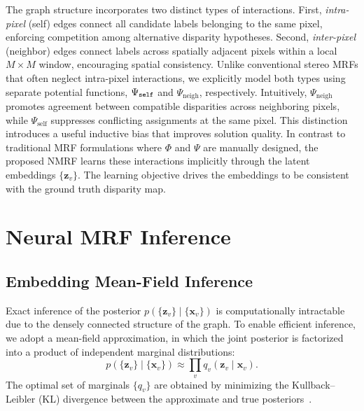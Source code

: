 The graph structure incorporates two distinct types of interactions.
First, \emph{intra-pixel} (self) edges connect all candidate labels belonging to the same pixel, enforcing competition among alternative disparity hypotheses.
Second, \emph{inter-pixel} (neighbor) edges connect labels across spatially adjacent pixels within a local $M \times M$ window, encouraging spatial consistency.
Unlike conventional stereo MRFs that often neglect intra-pixel interactions, we explicitly model both types using separate potential functions, $\Psi_{\tt{self}}$ and $\Psi_{\mathrm{neigh}}$, respectively.
Intuitively, $\Psi_{\mathrm{neigh}}$ promotes agreement between compatible disparities across neighboring pixels, while $\Psi_{\mathrm{self}}$ suppresses conflicting assignments at the same pixel. This distinction introduces a useful inductive bias that improves solution quality.
In contrast to traditional MRF formulations where $\Phi$ and $\Psi$ are manually designed, the proposed NMRF learns these interactions implicitly through the latent embeddings $\{\mathbf{z}_v\}$. The learning objective drives the embeddings to be consistent with the ground truth disparity map.

\section{Neural MRF Inference}\label{sec:mrf-inference}
\subsection{Embedding Mean-Field Inference}
Exact inference of the posterior $p(\{\mathbf{z}_v\} \mid \{\mathbf{x}_v\})$ is computationally intractable due to the densely connected structure of the graph.
To enable efficient inference, we adopt a mean-field approximation, in which the joint posterior is factorized into a product of independent marginal distributions:
\begin{equation}
	p(\{\mathbf{z}_v\} \mid \{\mathbf{x}_v\}) \approx \prod_{v} q_v(\mathbf{z}_v \mid \mathbf{x}_v).
\end{equation}
The optimal set of marginals $\{q_v\}$ are obtained by minimizing the Kullback–Leibler (KL) divergence between the approximate and true posteriors~\cite{dai2016discriminative}.

